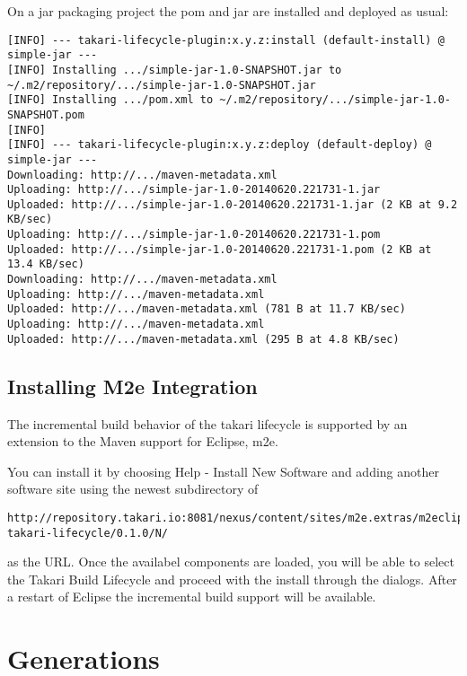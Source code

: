\documentclass[a4paper]{book}
\newcommand{\chap}[1]{\newpage\thispagestyle{empty}\chapter{#1}\label{chap:\thechapter}}
\begin{document}
On a jar packaging project the pom and jar are installed and deployed as usual:

\begin{shaded}\begin{verbatim}
[INFO] --- takari-lifecycle-plugin:x.y.z:install (default-install) @ simple-jar ---
[INFO] Installing .../simple-jar-1.0-SNAPSHOT.jar to ~/.m2/repository/.../simple-jar-1.0-SNAPSHOT.jar
[INFO] Installing .../pom.xml to ~/.m2/repository/.../simple-jar-1.0-SNAPSHOT.pom
[INFO]
[INFO] --- takari-lifecycle-plugin:x.y.z:deploy (default-deploy) @ simple-jar ---
Downloading: http://.../maven-metadata.xml
Uploading: http://.../simple-jar-1.0-20140620.221731-1.jar
Uploaded: http://.../simple-jar-1.0-20140620.221731-1.jar (2 KB at 9.2 KB/sec)
Uploading: http://.../simple-jar-1.0-20140620.221731-1.pom
Uploaded: http://.../simple-jar-1.0-20140620.221731-1.pom (2 KB at 13.4 KB/sec)
Downloading: http://.../maven-metadata.xml
Uploading: http://.../maven-metadata.xml
Uploaded: http://.../maven-metadata.xml (781 B at 11.7 KB/sec)
Uploading: http://.../maven-metadata.xml
Uploaded: http://.../maven-metadata.xml (295 B at 4.8 KB/sec)
\end{verbatim}\end{shaded}

\section{Installing M2e Integration}\label{installing-m2e-integration}

The incremental build behavior of the takari lifecycle is supported by an extension to the Maven support for Eclipse, m2e.

You can install it by choosing Help - Install New Software and adding another software site using the newest subdirectory of

\begin{shaded}\begin{verbatim}
http://repository.takari.io:8081/nexus/content/sites/m2e.extras/m2eclipse-takari-lifecycle/0.1.0/N/
\end{verbatim}\end{shaded}

as the URL. Once the availabel components are loaded, you will be able to select the Takari Build Lifecycle and proceed with the install through the dialogs. After a restart of Eclipse the incremental build support will be available.

\chap{Generations}\label{generations}
\end{document}
